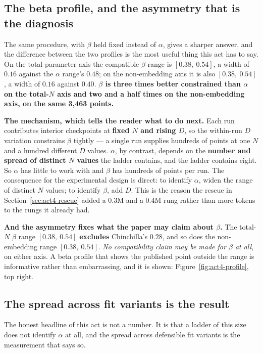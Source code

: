 \documentclass[11pt,a4paper]{article}
\begin{document}
\subsection{The beta profile, and the asymmetry that is the diagnosis}
\label{sec:act4-beta}

The same procedure, with $\beta$ held fixed instead of $\alpha$, gives a
sharper answer, and the difference between the two profiles is the most useful
thing this act has to say. On the total-parameter axis the compatible $\beta$
range is $[0.38,\ 0.54]$, a width of $0.16$ against the $\alpha$ range's
$0.48$; on the non-embedding axis it is also $[0.38,\ 0.54]$, a width of
$0.16$ against $0.40$. \textbf{$\beta$ is three times better constrained than
$\alpha$ on the total-$N$ axis and two and a half times on the non-embedding
axis, on the same 3,463 points.} %

\textbf{The mechanism, which tells the reader what to do next.} Each run
contributes interior checkpoints at \textbf{fixed $N$ and rising $D$}, so the
within-run $D$ variation constrains $\beta$ tightly --- a single run supplies
hundreds of points at one $N$ and a hundred different $D$ values. $\alpha$,
by contrast, depends on the \textbf{number and spread of distinct $N$ values}
the ladder contains, and the ladder contains eight. So $\alpha$ has little to
work with and $\beta$ has hundreds of points per run. The
consequence for the experimental design is direct: to identify $\alpha$, widen
the range of distinct $N$ values; to identify $\beta$, add $D$. This is the
reason the rescue in Section~\ref{sec:act4-rescue} added a $0.3$M and a
$0.4$M rung rather than more tokens to the rungs it already had.

\textbf{And the asymmetry fixes what the paper may claim about $\beta$.} The
total-$N$ $\beta$ range $[0.38,\ 0.54]$ \textbf{excludes} Chinchilla's
$0.28$, and so does the non-embedding range $[0.38,\ 0.54]$. \emph{No
compatibility claim may be made for $\beta$ at all}, on either axis. A beta
profile that shows the published point outside the range is informative rather
than embarrassing, and it is shown: Figure~\ref{fig:act4-profile}, top right.

\subsection{The spread across fit variants is the result}
\label{sec:act4-variants}

The honest headline of this act is not a number. It is that a ladder of this
size does not identify $\alpha$ at all, and the spread across defensible fit
variants is the measurement that says so. %
\end{document}
